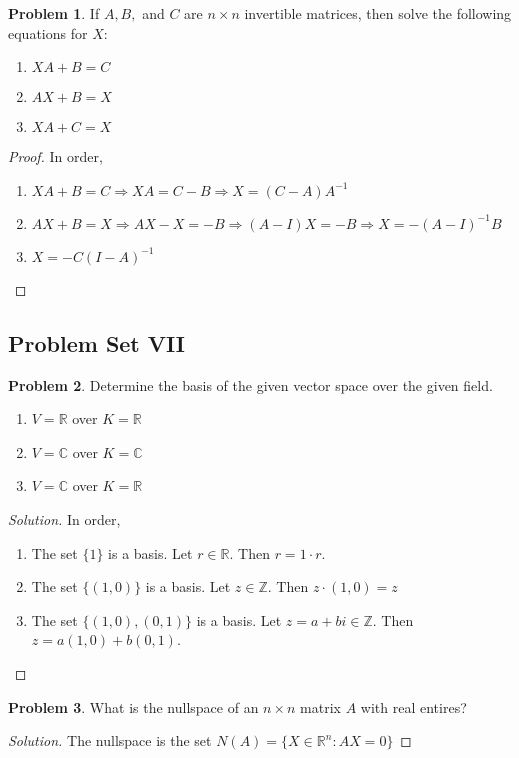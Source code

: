\documentclass[oneside]{book}
\theoremstyle{definition}
\newtheorem{problem}{Problem}[section]
\begin{document}
\begin{problem}
If $A,B,$ and $C$ are $n\times n$ invertible matrices, then solve the following equations for $X$:
\begin{enumerate}
\item $XA+B=C$
\item $AX+B=X$
\item $XA+C=X$
\end{enumerate}
\end{problem}
\begin{proof}
In order,
\begin{enumerate}
\item $XA +B=C\Rightarrow XA = C-B \Rightarrow X = (C-A)A^{-1}$
\item $AX+B = X\Rightarrow AX-X=-B \Rightarrow (A-I)X=-B \Rightarrow X = -(A-I)^{-1}B$
\item $X = -C(I-A)^{-1}$
\end{enumerate}
\end{proof}

\subsection*{Problem Set VII}

\begin{problem}
Determine the basis of the given vector space over the given field.
\begin{enumerate}
\item $V=\mathbb{R}$ over $K=\mathbb{R}$
\item $V=\mathbb{C}$ over $K=\mathbb{C}$
\item $V=\mathbb{C}$ over $K=\mathbb{R}$
\end{enumerate}
\end{problem}
\begin{proof}[Solution]
In order,
\begin{enumerate}
\item The set $\{1\}$ is a basis. Let $r \in \mathbb{R}$. Then $r=1\cdot r$.
\item The set $\{(1,0)\}$ is a basis. Let $z\in \mathbb{Z}$. Then $z\cdot(1,0) = z$
\item The set $\{(1,0),(0,1)\}$ is a basis. Let $z=a+bi\in \mathbb{Z}$. Then $z = a(1,0)+b(0,1)$.
\end{enumerate}
\end{proof}

\begin{problem}
What is the nullspace of an $n\times n$ matrix $A$ with real entires?
\end{problem}
\begin{proof}[Solution]
The nullspace is the set $N(A) = \{X\in \mathbb{R}^n: AX = 0\}$
\end{proof}
\end{document}
